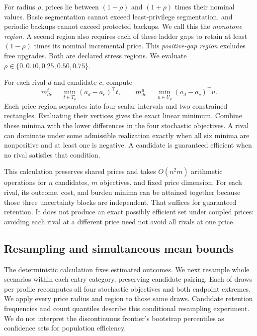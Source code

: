 \documentclass[conference,compsoc]{IEEEtran}
\begin{document}
For radius $\rho$, prices lie between $(1-\rho)$ and $(1+\rho)$ times
their nominal values. Basic segmentation cannot exceed least-privilege
segmentation, and periodic backups cannot exceed protected backups.
We call this the \emph{monotone region}. A second region also requires
each of these ladder gaps to retain at least $(1-\rho)$ times its nominal
incremental price. This \emph{positive-gap region} excludes free upgrades.
Both are declared stress regions. We evaluate
$\rho\in\{0,0.10,0.25,0.50,0.75\}$.

For each rival $d$ and candidate $c$, compute
\begin{equation}
 m^t_{dc}=\min_{t\in T_\rho}(a_d-a_c)^\top t,\qquad
 m^u_{dc}=\min_{u\in U_\rho}(a_d-a_c)^\top u. \label{eq:prices}
\end{equation}
Each price region separates into four scalar intervals and two constrained
rectangles. Evaluating their vertices gives the exact linear minimum.
Combine these minima with the lower differences in the four stochastic
objectives. A rival can dominate under some admissible realization exactly
when all six minima are nonpositive and at least one is negative. A candidate
is guaranteed efficient when no rival satisfies that condition.

This calculation preserves shared prices and takes $O(n^2m)$ arithmetic
operations for $n$ candidates, $m$ objectives, and fixed price dimension.
For each rival, its outcome, cost, and burden minima can
be attained together because those three uncertainty blocks are independent.
That suffices for guaranteed retention. It does not produce an exact
possibly efficient set under coupled prices: avoiding each rival at a
different price need not avoid all rivals at one price.

\subsection{Resampling and simultaneous mean bounds}
The deterministic calculation fixes estimated outcomes. We next resample
whole scenarios within each entry category, preserving candidate pairing.
Each of \BootstrapDraws{} draws per profile recomputes all four stochastic
objectives and both endpoint extremes. We apply every price radius and
region to those same draws. Candidate retention frequencies and count
quantiles describe this conditional resampling experiment. We do not
interpret the discontinuous frontier's bootstrap percentiles as confidence
sets for population efficiency.
\end{document}
